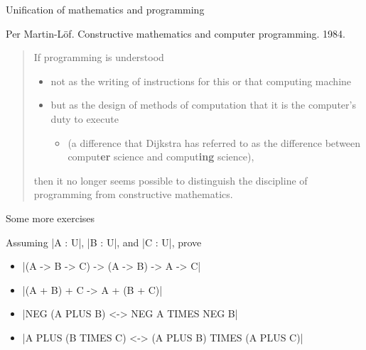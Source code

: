 \documentclass[t,compress,hyperref={hidelinks}]{beamer}
\begin{document}
\begin{frame}{Unification of mathematics and programming}

Per Martin-Löf. Constructive mathematics and computer programming. 1984.

\begin{quote}
\normalfont
If programming is understood
\vspace*{1ex}
\begin{itemize}
\item not as the writing of instructions for this or that computing machine
\vspace*{1ex}
\item but as the design of methods of computation that it is the computer's duty to execute
\vspace*{1ex}
\begin{itemize}
\item (a difference that Dijkstra has referred to as the difference between comput\textbf{er} science and comput\textbf{ing} science),
\end{itemize}
\end{itemize}
\vspace*{1ex}
then it no longer seems possible to distinguish the discipline of programming from constructive mathematics.
\end{quote}

\end{frame}

\begin{frame}{Some more exercises}

Assuming |A : U|, |B : U|, and |C : U|, prove

\begin{itemize}

\item |(A -> B -> C) -> (A -> B) -> A -> C|

\item |(A + B) + C -> A + (B + C)|

\item |NEG (A PLUS B) <-> NEG A TIMES NEG B|

\item |A PLUS (B TIMES C) <-> (A PLUS B) TIMES (A PLUS C)|

\end{itemize}

\end{frame}
\end{document}
